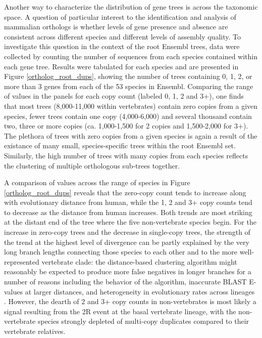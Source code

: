 Another way to characterize the distribution of gene trees is across
the taxonomic space. A question of particular interest to the
identification and analysis of mammalian orthologs is whether levels
of gene presence and absence are consistent across different species
and different levels of assembly quality. To investigate this question
in the context of the root Ensembl trees, data were collected by
counting the number of sequences from each species contained within
each gene tree. Results were tabulated for each species and are
presented in Figure \ref{ortholog_root_dups}, showing the number of
trees containing 0, 1, 2, or more than 3 genes from each of the 53
species in Ensembl. Comparing the range of values in the panels for
each copy count (labeled 0, 1, 2 and 3+), one finds that most trees
(8,000-11,000 within vertebrates) contain zero copies from a given
species, fewer trees contain one copy (4,000-6,000) and several
thousand contain two, three or more copies (ca. 1,000-1,500 for 2
copies and 1,500-2,000 for 3+). The plethora of trees with zero copies
from a given species is again a result of the existance of many small,
species-specific trees within the root Ensembl set. Similarly, the
high number of trees with many copies from each species reflects the
clustering of multiple orthologous sub-trees together.

A comparison of values across the range of species in Figure
\ref{ortholog_root_dups} reveals that the zero-copy count tends to
increase along with evolutionary distance from human, while the 1, 2
and 3+ copy counts tend to decrease as the distance from human
increases. Both trends are most striking at the distant end of the
tree where the five non-vertebrate species begin. For the increase in
zero-copy trees and the decrease in single-copy trees, the strength of
the trend at the highest level of divergence can be partly explained
by the very long branch lengths connecting those species to each other
and to the more well-represented vertebrate clade: the distance-based
clustering algorithm might reasonably be expected to produce more
false negatives in longer branches for a number of reasons including
the behavior of the \hclust algorithm, inaccurate BLAST E-values at
larger distances, and heterogeneity in evolutionary rates across
lineages \citep{TODO}. However, the dearth of 2 and 3+ copy counts in
non-vertebrates is most likely a signal resulting from the 2R event at
the basal vertebrate lineage, with the non-vertebrate species strongly
depleted of multi-copy duplicates compared to their vertebrate
relatives.


